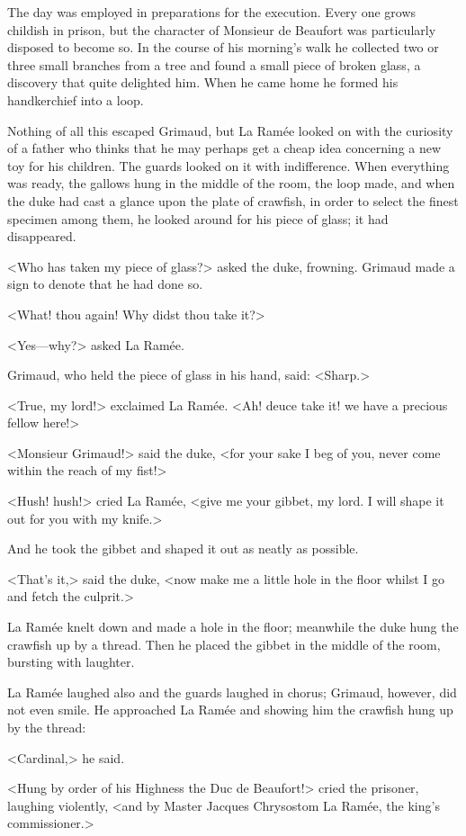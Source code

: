 The day was employed in preparations for the execution. Every one grows childish in prison, but the character of Monsieur de Beaufort was particularly disposed to become so. In the course of his morning's walk he collected two or three small branches from a tree and found a small piece of broken glass, a discovery that quite delighted him. When he came home he formed his handkerchief into a loop.

Nothing of all this escaped Grimaud, but La Ramée looked on with the curiosity of a father who thinks that he may perhaps get a cheap idea concerning a new toy for his children. The guards looked on it with indifference. When everything was ready, the gallows hung in the middle of the room, the loop made, and when the duke had cast a glance upon the plate of crawfish, in order to select the finest specimen among them, he looked around for his piece of glass; it had disappeared.

<Who has taken my piece of glass?> asked the duke, frowning. Grimaud made a sign to denote that he had done so.

<What! thou again! Why didst thou take it?>

<Yes—why?> asked La Ramée.

Grimaud, who held the piece of glass in his hand, said: <Sharp.>

<True, my lord!> exclaimed La Ramée. <Ah! deuce take it! we have a precious fellow here!>

<Monsieur Grimaud!> said the duke, <for your sake I beg of you, never come within the reach of my fist!>

<Hush! hush!> cried La Ramée, <give me your gibbet, my lord. I will shape it out for you with my knife.>

And he took the gibbet and shaped it out as neatly as possible.

<That's it,> said the duke, <now make me a little hole in the floor whilst I go and fetch the culprit.>

La Ramée knelt down and made a hole in the floor; meanwhile the duke hung the crawfish up by a thread. Then he placed the gibbet in the middle of the room, bursting with laughter.

La Ramée laughed also and the guards laughed in chorus; Grimaud, however, did not even smile. He approached La Ramée and showing him the crawfish hung up by the thread:

<Cardinal,> he said.

<Hung by order of his Highness the Duc de Beaufort!> cried the prisoner, laughing violently, <and by Master Jacques Chrysostom La Ramée, the king's commissioner.>

